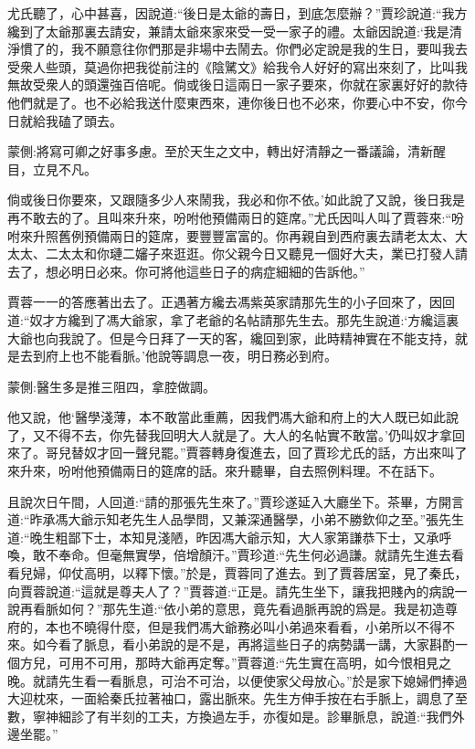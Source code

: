 \begin{parag}
    尤氏聽了，心中甚喜，因說道:“後日是太爺的壽日，到底怎麼辦？”賈珍說道:“我方纔到了太爺那裏去請安，兼請太爺來家來受一受一家子的禮。太爺因說道:‘我是清淨慣了的，我不願意往你們那是非場中去鬧去。你們必定說是我的生日，要叫我去受衆人些頭，莫過你把我從前注的《陰騭文》給我令人好好的寫出來刻了，比叫我無故受衆人的頭還強百倍呢。倘或後日這兩日一家子要來，你就在家裏好好的款待他們就是了。也不必給我送什麼東西來，連你後日也不必來，你要心中不安，你今日就給我磕了頭去。\begin{note}蒙側:將寫可卿之好事多慮。至於天生之文中，轉出好清靜之一番議論，清新醒目，立見不凡。\end{note}倘或後日你要來，又跟隨多少人來鬧我，我必和你不依。’如此說了又說，後日我是再不敢去的了。且叫來升來，吩咐他預備兩日的筵席。”尤氏因叫人叫了賈蓉來:“吩咐來升照舊例預備兩日的筵席，要豐豐富富的。你再親自到西府裏去請老太太、大太太、二太太和你璉二嬸子來逛逛。你父親今日又聽見一個好大夫，業已打發人請去了，想必明日必來。你可將他這些日子的病症細細的告訴他。”
\end{parag}


\begin{parag}
    賈蓉一一的答應著出去了。正遇著方纔去馮紫英家請那先生的小子回來了，因回道:“奴才方纔到了馮大爺家，拿了老爺的名帖請那先生去。那先生說道:‘方纔這裏大爺也向我說了。但是今日拜了一天的客，纔回到家，此時精神實在不能支持，就是去到府上也不能看脈。’他說等調息一夜，明日務必到府。\begin{note}蒙側:醫生多是推三阻四，拿腔做調。\end{note}他又說，他‘醫學淺薄，本不敢當此重薦，因我們馮大爺和府上的大人既已如此說了，又不得不去，你先替我回明大人就是了。大人的名帖實不敢當。’仍叫奴才拿回來了。哥兒替奴才回一聲兒罷。”賈蓉轉身復進去，回了賈珍尤氏的話，方出來叫了來升來，吩咐他預備兩日的筵席的話。來升聽畢，自去照例料理。不在話下。
\end{parag}


\begin{parag}
    且說次日午間，人回道:“請的那張先生來了。”賈珍遂延入大廳坐下。茶畢，方開言道:“昨承馮大爺示知老先生人品學問，又兼深通醫學，小弟不勝欽仰之至。”張先生道:“晚生粗鄙下士，本知見淺陋，昨因馮大爺示知，大人家第謙恭下士，又承呼喚，敢不奉命。但毫無實學，倍增顏汗。”賈珍道:“先生何必過謙。就請先生進去看看兒婦，仰仗高明，以釋下懷。”於是，賈蓉同了進去。到了賈蓉居室，見了秦氏，向賈蓉說道:“這就是尊夫人了？”賈蓉道:“正是。請先生坐下，讓我把賤內的病說一說再看脈如何？”那先生道:“依小弟的意思，竟先看過脈再說的爲是。我是初造尊府的，本也不曉得什麼，但是我們馮大爺務必叫小弟過來看看，小弟所以不得不來。如今看了脈息，看小弟說的是不是，再將這些日子的病勢講一講，大家斟酌一個方兒，可用不可用，那時大爺再定奪。”賈蓉道:“先生實在高明，如今恨相見之晚。就請先生看一看脈息，可治不可治，以便使家父母放心。”於是家下媳婦們捧過大迎枕來，一面給秦氏拉著袖口，露出脈來。先生方伸手按在右手脈上，調息了至數，寧神細診了有半刻的工夫，方換過左手，亦復如是。診畢脈息，說道:“我們外邊坐罷。”
\end{parag}


